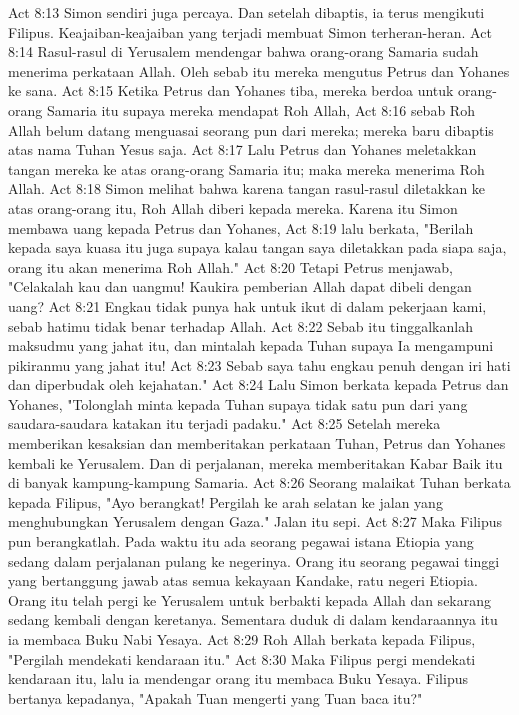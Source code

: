 Act 8:13  Simon sendiri juga percaya. Dan setelah dibaptis, ia terus mengikuti Filipus. Keajaiban-keajaiban yang terjadi membuat Simon terheran-heran.
Act 8:14  Rasul-rasul di Yerusalem mendengar bahwa orang-orang Samaria sudah menerima perkataan Allah. Oleh sebab itu mereka mengutus Petrus dan Yohanes ke sana.
Act 8:15  Ketika Petrus dan Yohanes tiba, mereka berdoa untuk orang-orang Samaria itu supaya mereka mendapat Roh Allah,
Act 8:16  sebab Roh Allah belum datang menguasai seorang pun dari mereka; mereka baru dibaptis atas nama Tuhan Yesus saja.
Act 8:17  Lalu Petrus dan Yohanes meletakkan tangan mereka ke atas orang-orang Samaria itu; maka mereka menerima Roh Allah.
Act 8:18  Simon melihat bahwa karena tangan rasul-rasul diletakkan ke atas orang-orang itu, Roh Allah diberi kepada mereka. Karena itu Simon membawa uang kepada Petrus dan Yohanes,
Act 8:19  lalu berkata, "Berilah kepada saya kuasa itu juga supaya kalau tangan saya diletakkan pada siapa saja, orang itu akan menerima Roh Allah."
Act 8:20  Tetapi Petrus menjawab, "Celakalah kau dan uangmu! Kaukira pemberian Allah dapat dibeli dengan uang?
Act 8:21  Engkau tidak punya hak untuk ikut di dalam pekerjaan kami, sebab hatimu tidak benar terhadap Allah.
Act 8:22  Sebab itu tinggalkanlah maksudmu yang jahat itu, dan mintalah kepada Tuhan supaya Ia mengampuni pikiranmu yang jahat itu!
Act 8:23  Sebab saya tahu engkau penuh dengan iri hati dan diperbudak oleh kejahatan."
Act 8:24  Lalu Simon berkata kepada Petrus dan Yohanes, "Tolonglah minta kepada Tuhan supaya tidak satu pun dari yang saudara-saudara katakan itu terjadi padaku."
Act 8:25  Setelah mereka memberikan kesaksian dan memberitakan perkataan Tuhan, Petrus dan Yohanes kembali ke Yerusalem. Dan di perjalanan, mereka memberitakan Kabar Baik itu di banyak kampung-kampung Samaria.
Act 8:26  Seorang malaikat Tuhan berkata kepada Filipus, "Ayo berangkat! Pergilah ke arah selatan ke jalan yang menghubungkan Yerusalem dengan Gaza." Jalan itu sepi.
Act 8:27  Maka Filipus pun berangkatlah. Pada waktu itu ada seorang pegawai istana Etiopia yang sedang dalam perjalanan pulang ke negerinya. Orang itu seorang pegawai tinggi yang bertanggung jawab atas semua kekayaan Kandake, ratu negeri Etiopia. Orang itu telah pergi ke Yerusalem untuk berbakti kepada Allah dan sekarang sedang kembali dengan keretanya. Sementara duduk di dalam kendaraannya itu ia membaca Buku Nabi Yesaya.
Act 8:29  Roh Allah berkata kepada Filipus, "Pergilah mendekati kendaraan itu."
Act 8:30  Maka Filipus pergi mendekati kendaraan itu, lalu ia mendengar orang itu membaca Buku Yesaya. Filipus bertanya kepadanya, "Apakah Tuan mengerti yang Tuan baca itu?"
